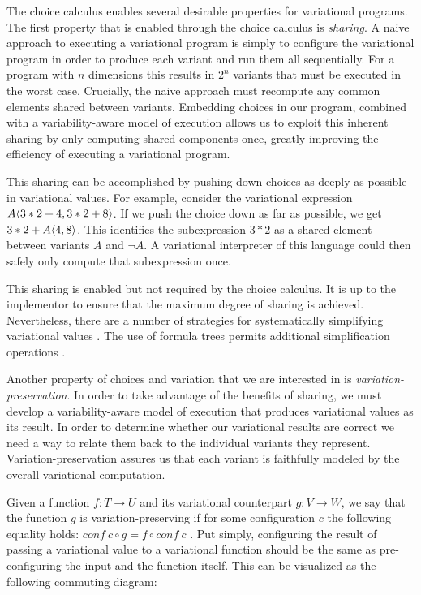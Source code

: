 \documentclass[12pt,oneside]{book}
\begin{document}
The choice calculus enables several desirable properties for variational programs.
The first property that is enabled through the choice calculus is \emph{sharing}. A naive approach to executing a variational program is simply to
configure the variational program in order to produce each variant and run them all sequentially.
For a program with $n$ dimensions this results in $2^n$ variants that must be executed in the worst case. Crucially,
the naive approach must recompute any common elements shared between variants. Embedding
choices in our program, combined with a variability-aware model of execution allows us to exploit this
inherent sharing by only computing shared components once, greatly improving the efficiency of
executing a variational program.

This sharing can be accomplished by pushing down choices as deeply as possible in variational
values. For example, consider the variational expression $A \langle 3*2+4, 3*2+8 \rangle$. If we push
the choice down as far as possible, we get $3*2+A \langle 4, 8 \rangle$. This identifies the subexpression
$3*2$ as a shared element between variants $A$ and $\neg A$. A variational interpreter of this
language could then safely only compute that subexpression once.

This sharing is enabled but not required by the choice calculus. It is up to the implementor to
ensure that the maximum degree of sharing is achieved. Nevertheless, there are a number of
strategies for systematically simplifying variational values \cite{Walk13thesis}. The use of formula
trees permits additional simplification operations \cite{HW16fosd,WO14gpce}.

Another property of choices and variation that we are interested in is \emph{variation-preservation}. In order
to take advantage of the benefits of sharing, we must develop a variability-aware model of execution
that produces variational values as its result. In order to determine whether our variational results
are correct we need a way to relate them back to the individual variants they represent.
Variation-preservation assures us that each variant is faithfully modeled by the overall variational computation.

Given a function $f : T \rightarrow U$ and its variational counterpart $g : V \rightarrow W$, we say that
the function $g$ is variation-preserving if for some configuration $c$ the following equality holds:
$\mathit{conf}\ c \circ g = f \circ \mathit{conf}\ c$ \cite{HW16fosd}. Put simply, configuring the result
of passing a variational value to a variational function should be the same as pre-configuring the input
and the function itself. This can be visualized as the following commuting diagram:
\end{document}

